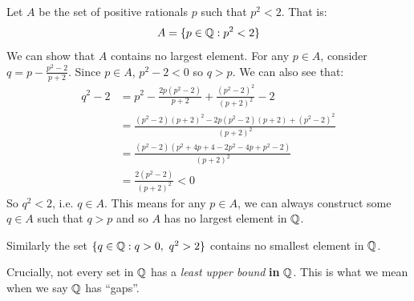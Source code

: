 \documentclass[../main.tex]{subfiles}
\begin{document}
\begin{example}
  \label{rationalUpperBound}
  Let $A$ be the set of positive rationals $p$ such that $p^2 < 2$.
  That is:
  \[
    A = \{p \in \mathbb{Q} : p^2 < 2\}
  \]
  We can show that $A$ contains no largest element.
  For any $p \in A$, consider $q = p - \frac{p^2 - 2}{p + 2}$.
  Since $p \in A$, $p^2 - 2 < 0$ so $q > p$.
  We can also see that:
  \begin{align*}
    q^2 - 2 &= p^2 - \frac{2p(p^2 - 2)}{p + 2} + \frac{(p^2 - 2)^2}{(p + 2)^2} - 2 \\
            &= \frac{(p^2 - 2)(p + 2)^2 - 2p(p^2 - 2)(p + 2) + (p^2 - 2)^2}{(p + 2)^2} \\
            &= \frac{(p^2 - 2)(p^2 + 4p + 4 - 2p^2 - 4p + p^2 - 2)}{(p + 2)^2} \\
            &= \frac{2(p^2 - 2)}{(p + 2)^2} < 0
  \end{align*}
  So $q^2 < 2$, i.e. $q \in A$.
  This means for any $p \in A$, we can always construct some $q \in A$ such that $q > p$ and so $A$ has no largest element in $\mathbb{Q}$.

  Similarly the set $\{q \in \Q: q > 0,\ q^2 > 2\}$ contains no smallest element in $\mathbb{Q}$.
\end{example}
Crucially, not every set in $\mathbb{Q}$ has a \textit{least upper bound} \textbf{in} $\mathbb{Q}$.
This is what we mean when we say $\mathbb{Q}$ has ``gaps''.
\end{document}
